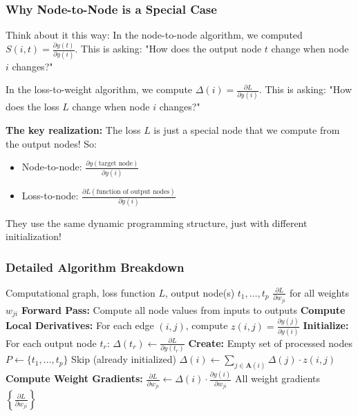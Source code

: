 \begin{notechapter}
\subsubsection{Why Node-to-Node is a Special Case}

Think about it this way: In the node-to-node algorithm, we computed $S(i,t) = \frac{\partial y(t)}{\partial y(i)}$. This is asking: "How does the output node $t$ change when node $i$ changes?"

In the loss-to-weight algorithm, we compute $\Delta(i) = \frac{\partial L}{\partial y(i)}$. This is asking: "How does the loss $L$ change when node $i$ changes?"

\textbf{The key realization:} The loss $L$ is just a special node that we compute from the output nodes! So:
\begin{itemize}
    \item Node-to-node: $\frac{\partial y(\text{target node})}{\partial y(i)}$
    \item Loss-to-node: $\frac{\partial L(\text{function of output nodes})}{\partial y(i)}$
\end{itemize}

They use the same dynamic programming structure, just with different initialization!

\subsubsection{Detailed Algorithm Breakdown}

\begin{algorithm}[H]
\caption{Backpropagation for Loss-to-Weight Derivatives (Detailed)}
\begin{algorithmic}[1]
\Require Computational graph, loss function $L$, output node(s) $t_1, \ldots, t_p$
\Ensure $\frac{\partial L}{\partial w_{ji}}$ for all weights $w_{ji}$
\State \textbf{Forward Pass:} Compute all node values from inputs to outputs
\State \textbf{Compute Local Derivatives:} For each edge $(i,j)$, compute $z(i,j) = \frac{\partial y(j)}{\partial y(i)}$
\State \textbf{Initialize:} For each output node $t_r$: $\Delta(t_r) \gets \frac{\partial L}{\partial y(t_r)}$ 
\State \textbf{Create:} Empty set of processed nodes $P \gets \{t_1, \ldots, t_p\}$
 
        \State Skip (already initialized) 
    \Else
        \State $\Delta(i) \gets \sum_{j \in \mathbf{A}(i)} \Delta(j) \cdot z(i,j)$ 
    \EndIf
\EndFor
\State \textbf{Compute Weight Gradients:}
    \State $\frac{\partial L}{\partial w_{ji}} \gets \Delta(i) \cdot \frac{\partial y(i)}{\partial w_{ji}}$ 
\EndFor
\State \Return All weight gradients $\left\{\frac{\partial L}{\partial w_{ji}}\right\}$
\end{algorithmic}
\end{algorithm}


\end{notechapter}
